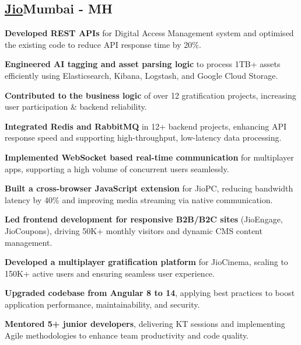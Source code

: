 \subsection{{\large \href{https://www.jio.com/}{\textbf{Jio}}\hfill \normalsize Mumbai - MH}}
\begin{zitemize}

\item \textbf{Developed REST APIs} for Digital Access Management system and optimised the existing code to reduce API response time by 20\%.

\item \textbf{Engineered AI tagging and asset parsing logic} to process 1TB+ assets efficiently using Elasticsearch, Kibana, Logstash, and Google Cloud Storage.

\item \textbf{Contributed to the business logic} of over 12 gratification projects, increasing user participation \& backend reliability.

\item \textbf{Integrated Redis and RabbitMQ} in 12+ backend projects, enhancing API response speed and supporting high-throughput, low-latency data processing.

\item \textbf{Implemented WebSocket based real-time communication} for multiplayer apps, supporting a high volume of concurrent users seamlessly.

\item \textbf{Built a cross-browser JavaScript extension} for JioPC, reducing bandwidth latency by 40\% and improving media streaming via native communication.


\item \textbf{Led frontend development for responsive B2B/B2C sites} (JioEngage, JioCoupons), driving 50K+ monthly visitors and dynamic CMS content management.

\item \textbf{Developed a multiplayer gratification platform} for JioCinema, scaling to 150K+ active users and ensuring seamless user experience.

\item \textbf{Upgraded codebase from Angular 8 to 14}, applying best practices to boost application performance, maintainability, and security.

\item \textbf{Mentored 5+ junior developers}, delivering KT sessions and implementing Agile methodologies to enhance team productivity and code quality.

\end{zitemize}


